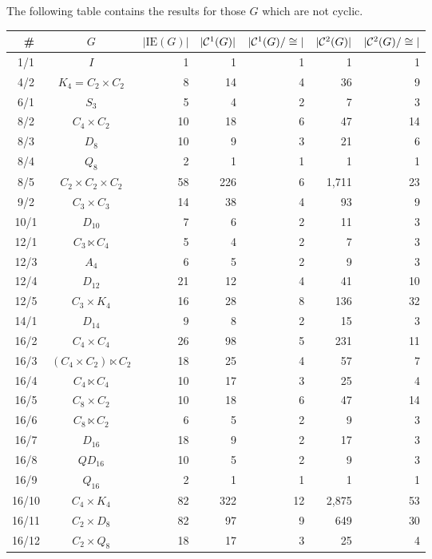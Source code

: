 \documentclass[a4paper,11pt]{article}
\theoremstyle{plain}
\theoremstyle{definition}
\begin{document}
The following table contains the results for those $G$ which are not cyclic. 
\begin{longtable}{ccrrrrr}
	\hline 
	{\GAP\ }\# 
	    & $G$ 
	        & $|\mathrm{IE}(G)|$ 
	            & $|\mathcal{C}^1(G)|$ 
	                & $|\mathcal{C}^1(G)/\cong |$ 
	                    & $|\mathcal{C}^{2}(G)|$ 
	                        & $|\mathcal{C}^{2}(G)/\cong |$  \\ 
	\hline
	1/1 & $I$ & 1 & 1 & 1 & 1 & 1 \\ 
	4/2 & $K_4 = C_2 \times C_2$ & 8 & 14 & 4 & 36 & 9 \\ 
	6/1 & $S_3$ & 5 & 4 & 2 & 7 & 3 \\ 
	8/2 & $C_4 \times C_2$ & 10 & 18 & 6 & 47 & 14 \\ 
	8/3 & $D_8$ & 10 & 9 & 3 & 21 & 6 \\ 
	8/4 & $Q_8$ & 2 & 1 & 1 & 1 & 1 \\ 
	8/5 & $C_2 \times C_2 \times C_2$ & 58 & 226 & 6 & 1,711 & 23 \\ 
	9/2 & $C_3 \times C_3$ & 14 & 38 & 4 & 93 & 9 \\ 
	10/1 & $D_{10}$ & 7 & 6 & 2 & 11 & 3 \\ 
	12/1 & $C_3 \ltimes C_4$ & 5 & 4 & 2 & 7 & 3 \\ 
	12/3 & $A_4$ & 6 & 5 & 2 & 9 & 3 \\ 
	12/4 & $D_{12}$ & 21 & 12 & 4 & 41 & 10 \\ 
	12/5 & $C_3 \times K_4$ & 16 & 28 & 8 & 136 & 32 \\ 
	14/1 & $D_{14}$ & 9 & 8 & 2 & 15 & 3 \\ 
	16/2 & $C_4 \times C_4$ & 26 & 98 & 5 & 231 & 11 \\ 
	16/3 & $(C_4 \times C_2) \ltimes C_2$ & 18 & 25 & 4 & 57 & 7 \\ 
	16/4 & $C_4 \ltimes C_4$ & 10 & 17 & 3 & 25 & 4 \\ 
	16/5 & $C_8 \times C_2$ & 10 & 18 & 6 & 47 & 14 \\ 
	16/6 & $C_8 \ltimes C_2$ & 6 & 5 & 2 & 9 & 3 \\ 
	16/7 & $D_{16}$ & 18 & 9 & 2 & 17 & 3 \\ 
	16/8 & $QD_{16}$ & 10 & 5 & 2 & 9 & 3 \\ 
	16/9 & $Q_{16}$ & 2 & 1 & 1 & 1 & 1 \\ 
	16/10 & $C_4 \times K_4$ & 82 & 322 & 12 & 2,875 & 53 \\ 
	16/11 & $C_2 \times D_8$ & 82 & 97 & 9 & 649 & 30 \\ 
	16/12 & $C_2 \times Q_8$ & 18 & 17 & 3 & 25 & 4 \\ 

\end{longtable}
\end{document}
